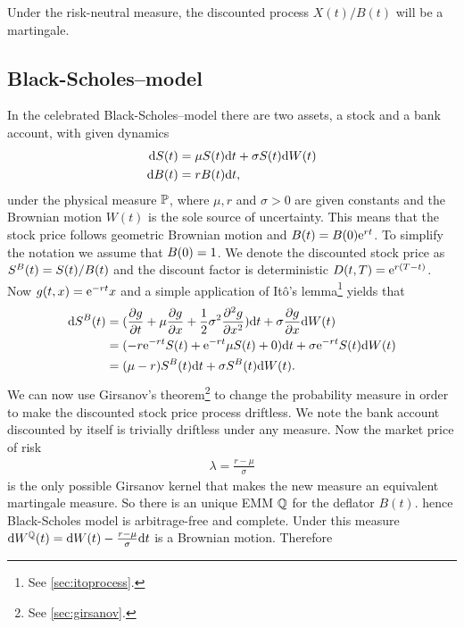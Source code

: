 Under the risk-neutral measure, the discounted process $X(t) / B(t)$ will be a martingale.
	
\subsection{Black-Scholes--model}

In the celebrated Black-Scholes--model there are two assets, a stock and a bank account, with given dynamics
  \begin{align}
    \label{stockprocessinblackscholes}
    \mathrm{d} S(t) &= \mu S(t) \mathrm{d} t + \sigma S(t) \mathrm{d} W(t) \\
    \mathrm{d} B (t) &= r B(t) \mathrm{d} t, 
  \end{align}
under the physical measure $\mathbb{P}$, where $\mu, r$ and $\sigma > 0$ are given constants and the Brownian motion $W(t)$ is the sole source of uncertainty. This means that the stock price follows geometric Brownian motion and $B (t) = B (0) \mathrm{e}^{rt}$. To simplify the notation we assume that $B (0) = 1$. We denote the discounted stock price as $S^B(t) = S(t) / B (t)$ and the discount factor is deterministic $D (t,T) = \mathrm{e}^{r(T-t)}$. Now $g(t,x) = \mathrm{e}^{-rt} x$ and a simple application of It\^{o}'s lemma\footnote{See \ref{sec:itoprocess}.} yields that
  \begin{align}
    \mathrm{d} S^B(t) &= ( \frac{\partial g}{\partial t} + \mu \frac{\partial g}{\partial x} + \frac{1}{2} \sigma^2 \frac{\partial^2 g}{\partial x^2} ) \mathrm{d} t + \sigma \frac{\partial g}{\partial x} \mathrm{d} W(t) \\
      &= ( -r \mathrm{e}^{-rt} S(t) + \mathrm{e}^{-rt} \mu S(t) + 0 ) \mathrm{d} t + \sigma \mathrm{e}^{-rt} S(t) \mathrm{d} W(t) \\
      &= ( \mu - r ) S^B(t) \mathrm{d} t + \sigma S^B(t) \mathrm{d} W(t) .
  \end{align}
We can now use Girsanov's theorem\footnote{See \ref{sec:girsanov}.} to change the probability measure in order to make the discounted stock price process driftless. We note the bank account discounted by itself is trivially driftless under any measure. Now the market price of risk
	\begin{align}
		\lambda = \frac{r - \mu}{\sigma}
	\end{align}
is the only possible Girsanov kernel that makes the new measure an equivalent martingale measure. So there is an unique EMM $\mathbb{Q}$ for the deflator $B(t)$. hence Black-Scholes model is arbitrage-free and complete. Under this measure $\mathrm{d} W^{\mathbb{Q}}(t) = \mathrm{d} W(t) - \frac{r - \mu}{\sigma} \mathrm{d} t$ is a Brownian motion. Therefore
